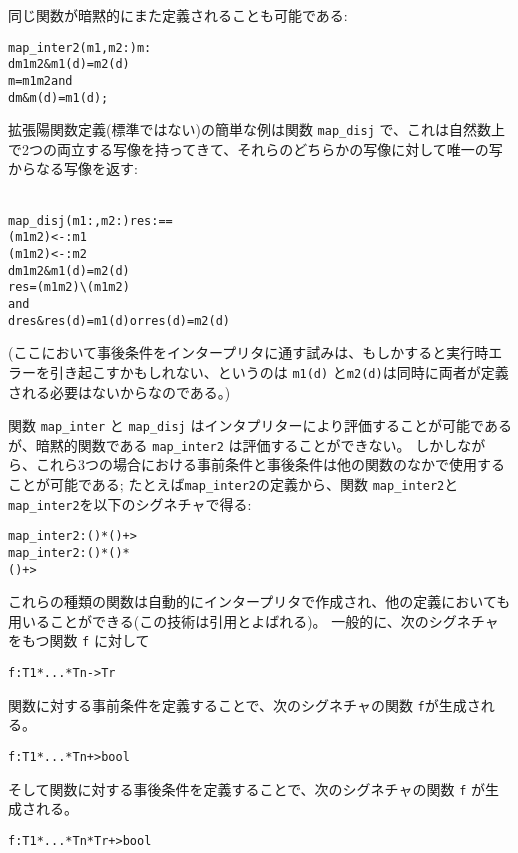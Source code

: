 \documentclass[\pformat,12pt]{jarticle}
\begin{document}
同じ関数が暗黙的にまた定義されることも可能である:
\begin{alltt}
  map_inter2 (m1,m2: ) m: 
    d  m1  m2 & m1(d) = m2(d)
    m =  m1  m2 and
        d  m & m(d) = m1(d);
\end{alltt}

拡張陽関数定義(標準ではない)の簡単な例は関数 \texttt{map\_disj} で、これは自然数上で2つの両立する写像を持ってきて、それらのどちらかの写像に対して唯一の写からなる写像を返す:

\begin{alltt}\label{mapdisj}
  map_disj (m1:,m2:) res :  ==
    ( m1  m2) <-: m1 
    ( m1  m2) <-: m2
    d  m1  m2 & m1(d) = m2(d)
    res = ( m1  m2) \verb+\+ ( m1  m2) 
       and
        d  res & res(d) = m1(d) or res(d) = m2(d)
\end{alltt}
(ここにおいて事後条件をインタープリタに通す試みは、もしかすると実行時エラーを引き起こすかもしれない、というのは \texttt{m1(d)} と\texttt{m2(d)}は同時に両者が定義される必要はないからなのである。)

関数 {\tt map\_inter} と {\tt map\_disj} はインタプリターにより評価することが可能であるが、暗黙的関数である {\tt map\_inter2} は評価することができない。
しかしながら、これら3つの場合における事前条件と事後条件は他の関数のなかで使用することが可能である; たとえば\texttt{map\_inter2}の定義から、関数 \texttt{map\_inter2}と \texttt{map\_inter2}を以下のシグネチャで得る:

\begin{alltt}
  map_inter2 : () * () +> 
  map_inter2 : () * () *
                   () +> 
\end{alltt}
これらの種類の関数は自動的にインタープリタで作成され、他の定義においても用いることができる(この技術は引用とよばれる)。
一般的に、次のシグネチャをもつ関数 \texttt{f} に対して
\begin{alltt}
  f : T1 * ... * Tn -> Tr
\end{alltt}
関数に対する事前条件を定義することで、次のシグネチャの関数 \texttt{f}が生成される。
\begin{alltt}
  f : T1 * ... * Tn +> bool
\end{alltt}
そして関数に対する事後条件を定義することで、次のシグネチャの関数 \texttt{f} が生成される。
\begin{alltt}
  f : T1 * ... * Tn * Tr +> bool
\end{alltt}
\end{document}
